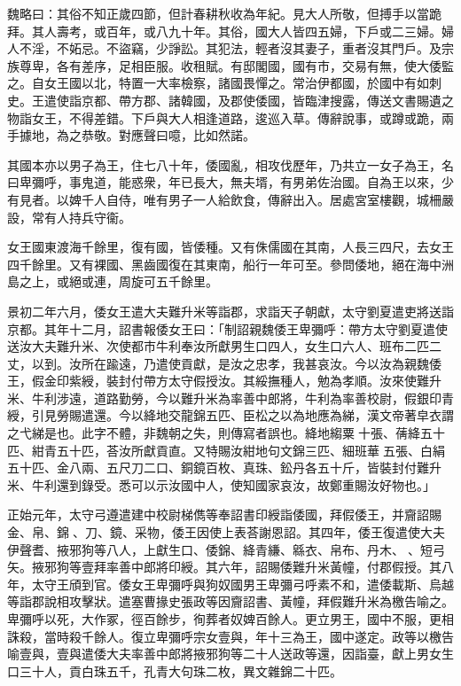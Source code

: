 \begin{pinyinscope}
魏略曰：其俗不知正歲四節，但計春耕秋收為年紀。見大人所敬，但搏手以當跪拜。其人壽考，或百年，或八九十年。其俗，國大人皆四五婦，下戶或二三婦。婦人不淫，不妬忌。不盜竊，少諍訟。其犯法，輕者沒其妻子，重者沒其門戶。及宗族尊卑，各有差序，足相臣服。收租賦。有邸閣國，國有市，交易有無，使大倭監之。自女王國以北，特置一大率檢察，諸國畏憚之。常治伊都國，於國中有如刺史。王遣使詣京都、帶方郡、諸韓國，及郡使倭國，皆臨津搜露，傳送文書賜遺之物詣女王，不得差錯。下戶與大人相逢道路，逡巡入草。傳辭說事，或蹲或跪，兩手據地，為之恭敬。對應聲曰噫，比如然諾。

其國本亦以男子為王，住七八十年，倭國亂，相攻伐歷年，乃共立一女子為王，名曰卑彌呼，事鬼道，能惑衆，年已長大，無夫壻，有男弟佐治國。自為王以來，少有見者。以婢千人自侍，唯有男子一人給飲食，傳辭出入。居處宮室樓觀，城柵嚴設，常有人持兵守衞。

女王國東渡海千餘里，復有國，皆倭種。又有侏儒國在其南，人長三四尺，去女王四千餘里。又有裸國、黑齒國復在其東南，船行一年可至。參問倭地，絕在海中洲島之上，或絕或連，周旋可五千餘里。

景初二年六月，倭女王遣大夫難升米等詣郡，求詣天子朝獻，太守劉夏遣吏將送詣京都。其年十二月，詔書報倭女王曰：「制詔親魏倭王卑彌呼：帶方太守劉夏遣使送汝大夫難升米、次使都巿牛利奉汝所獻男生口四人，女生口六人、班布二匹二丈，以到。汝所在踰遠，乃遣使貢獻，是汝之忠孝，我甚哀汝。今以汝為親魏倭王，假金印紫綬，裝封付帶方太守假授汝。其綏撫種人，勉為孝順。汝來使難升米、牛利涉遠，道路勤勞，今以難升米為率善中郎將，牛利為率善校尉，假銀印青綬，引見勞賜遣還。今以絳地交龍錦五匹、臣松之以為地應為綈，漢文帝著皁衣謂之弋綈是也。此字不體，非魏朝之失，則傳寫者誤也。絳地縐粟𦋺十張、蒨絳五十匹、紺青五十匹，荅汝所獻貢直。又特賜汝紺地句文錦三匹、細班華𦋺五張、白絹五十匹、金八兩、五尺刀二口、銅鏡百枚、真珠、鈆丹各五十斤，皆裝封付難升米、牛利還到錄受。悉可以示汝國中人，使知國家哀汝，故鄭重賜汝好物也。」

正始元年，太守弓遵遣建中校尉梯儁等奉詔書印綬詣倭國，拜假倭王，并齎詔賜金、帛、錦𦋺、刀、鏡、采物，倭王因使上表荅謝恩詔。其四年，倭王復遣使大夫伊聲耆、掖邪狗等八人，上獻生口、倭錦、絳青縑、緜衣、帛布、丹木、򠐂、短弓矢。掖邪狗等壹拜率善中郎將印綬。其六年，詔賜倭難升米黃幢，付郡假授。其八年，太守王頎到官。倭女王卑彌呼與狗奴國男王卑彌弓呼素不和，遣倭載斯、烏越等詣郡說相攻擊狀。遣塞曹掾史張政等因齎詔書、黃幢，拜假難升米為檄告喻之。卑彌呼以死，大作冢，徑百餘步，徇葬者奴婢百餘人。更立男王，國中不服，更相誅殺，當時殺千餘人。復立卑彌呼宗女壹與，年十三為王，國中遂定。政等以檄告喻壹與，壹與遣倭大夫率善中郎將掖邪狗等二十人送政等還，因詣臺，獻上男女生口三十人，貢白珠五千，孔青大句珠二枚，異文雜錦二十匹。


\end{pinyinscope}
